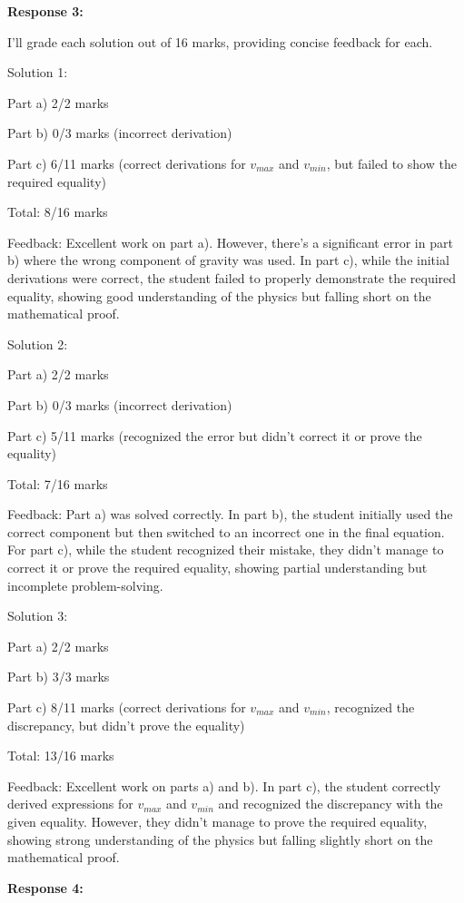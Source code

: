 \documentclass[a4paper,11pt]{article}
\begin{document}
\bigskip
\textbf{Response 3:}

I'll grade each solution out of 16 marks, providing concise feedback for each.

Solution 1:

Part a) 2/2 marks

Part b) 0/3 marks (incorrect derivation)

Part c) 6/11 marks (correct derivations for \(v_{max}\) and \(v_{min}\), but failed to show the required equality)

Total: 8/16 marks

Feedback: Excellent work on part a). However, there's a significant error in part b) where the wrong component of gravity was used. In part c), while the initial derivations were correct, the student failed to properly demonstrate the required equality, showing good understanding of the physics but falling short on the mathematical proof.

Solution 2:

Part a) 2/2 marks

Part b) 0/3 marks (incorrect derivation)

Part c) 5/11 marks (recognized the error but didn't correct it or prove the equality)

Total: 7/16 marks

Feedback: Part a) was solved correctly. In part b), the student initially used the correct component but then switched to an incorrect one in the final equation. For part c), while the student recognized their mistake, they didn't manage to correct it or prove the required equality, showing partial understanding but incomplete problem-solving.

Solution 3:

Part a) 2/2 marks

Part b) 3/3 marks

Part c) 8/11 marks (correct derivations for \(v_{max}\) and \(v_{min}\), recognized the discrepancy, but didn't prove the equality)

Total: 13/16 marks

Feedback: Excellent work on parts a) and b). In part c), the student correctly derived expressions for \(v_{max}\) and \(v_{min}\) and recognized the discrepancy with the given equality. However, they didn't manage to prove the required equality, showing strong understanding of the physics but falling slightly short on the mathematical proof.

\bigskip
\textbf{Response 4:}
\end{document}
